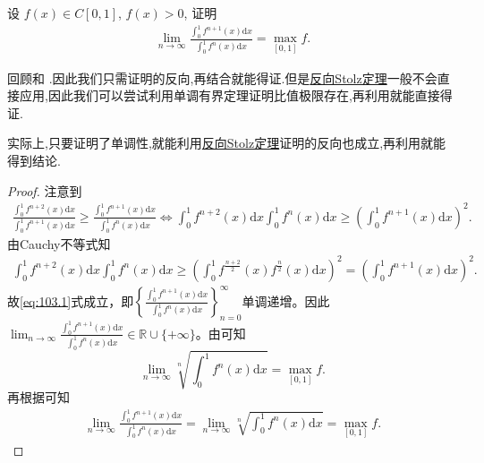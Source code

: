 \documentclass[../../main.tex]{subfiles}%
\begin{document}
\begin{example}
设 $f(x) \in C[0,1]$, $f(x) > 0$, 证明
\begin{align*}
\lim_{n \to \infty} \frac{\int_0^1 f^{n+1}(x) \mathrm{d}x}{\int_0^1 f^n(x) \mathrm{d}x} = \max_{[0,1]} f.
\end{align*}
\end{example}
\begin{note}
回顾和
.因此我们只需证明的反向,再结合就能得证.但是\hyperref[theorem:反向Stolz定理]{反向Stolz定理}一般不会直接应用,因此我们可以尝试利用单调有界定理证明比值极限存在,再利用就能直接得证.

实际上,只要证明了单调性,就能利用\hyperref[theorem:反向Stolz定理]{反向Stolz定理}证明的反向也成立,再利用就能得到结论.
\end{note}
\begin{proof}
注意到
\begin{align}
\frac{\int_0^1 f^{n+2}(x) \mathrm{d}x}{\int_0^1 f^{n+1}(x) \mathrm{d}x} \geqslant \frac{\int_0^1 f^{n+1}(x) \mathrm{d}x}{\int_0^1 f^n(x) \mathrm{d}x} \Longleftrightarrow \int_0^1 f^{n+2}(x) \mathrm{d}x \int_0^1 f^n(x) \mathrm{d}x \geqslant \left( \int_0^1 f^{n+1}(x) \mathrm{d}x \right)^2.\label{eq:103.1}
\end{align}
由Cauchy不等式知
\begin{align*}
\int_0^1 f^{n+2}(x) \mathrm{d}x \int_0^1 f^n(x) \mathrm{d}x \geqslant \left( \int_0^1 f^{\frac{n+2}{2}}(x) f^{\frac{n}{2}}(x) \mathrm{d}x \right)^2 = \left( \int_0^1 f^{n+1}(x) \mathrm{d}x \right)^2.
\end{align*}
故\eqref{eq:103.1}式成立，即$\left\{ \frac{\int_0^1 f^{n+1}(x) \mathrm{d}x}{\int_0^1 f^n(x) \mathrm{d}x} \right\}_{n=0}^{\infty}$单调递增。因此$\lim_{n \to \infty} \frac{\int_0^1 f^{n+1}(x) \mathrm{d}x}{\int_0^1 f^n(x) \mathrm{d}x} \in \mathbb{R} \cup \{ +\infty \}$。由可知$$\lim_{n \to \infty} \sqrt[n]{\int_0^1 f^n(x) \mathrm{d}x} = \max_{[0,1]} f.$$再根据可知
\begin{align*}
\lim_{n \to \infty} \frac{\int_0^1 f^{n+1}(x) \mathrm{d}x}{\int_0^1 f^n(x) \mathrm{d}x} = \lim_{n \to \infty} \sqrt[n]{\int_0^1 f^n(x) \mathrm{d}x} = \max_{[0,1]} f.
\end{align*}
\end{proof}
\end{document}
